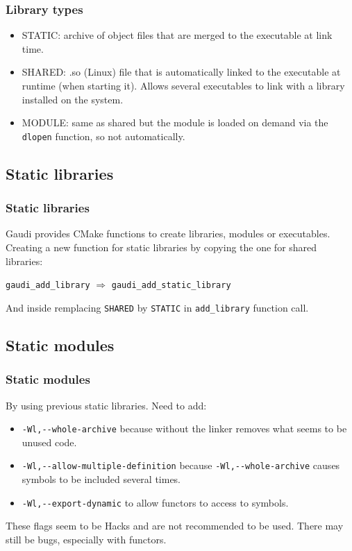 \documentclass{beamer}
\begin{document}
    \begin{frame}[fragile]
        \frametitle{Library types}

        \begin{itemize}
            \item STATIC: archive of object files that are merged to the executable at link time.
            \item SHARED: .so (Linux) file that is automatically linked to the executable at runtime (when starting it).
            Allows several executables to link with a library installed on the system.
            \item MODULE: same as shared but the module is loaded on demand via the \verb'dlopen' function, so not automatically.
        \end{itemize}
    \end{frame}

    \subsection{Static libraries}

    \begin{frame}[fragile]
        \frametitle{Static libraries}

        Gaudi provides CMake functions to create libraries, modules or executables.
        Creating a new function for static libraries by copying the one for shared libraries:

        \verb'gaudi_add_library' $\Rightarrow$ \verb'gaudi_add_static_library'

        And inside remplacing \verb'SHARED' by \verb'STATIC' in \verb'add_library' function call.
    \end{frame}

    \subsection{Static modules}

    \begin{frame}[fragile]
        \frametitle{Static modules}

        By using previous static libraries.
        Need to add:
        \begin{itemize}
            \item \verb'-Wl,--whole-archive' because without the linker removes what seems to be unused code.
            \item \verb'-Wl,--allow-multiple-definition' because \verb'-Wl,--whole-archive' causes symbols to be included several times.
            \item \verb'-Wl,--export-dynamic' to allow functors to access to symbols.
        \end{itemize}

        These flags seem to be Hacks and are not recommended to be used.
        There may still be bugs, especially with functors.
    \end{frame}
\end{document}
